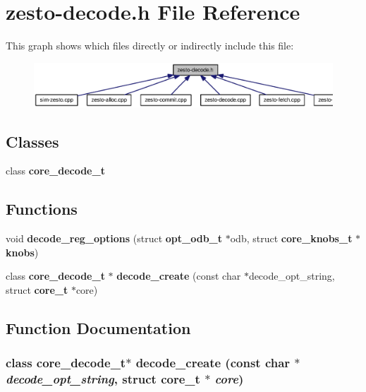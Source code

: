 \section{zesto-decode.h File Reference}
\label{zesto-decode_8h}


This graph shows which files directly or indirectly include this file:\nopagebreak
\begin{figure}[H]
\begin{center}
\leavevmode
\includegraphics[width=326pt]{zesto-decode_8h__dep__incl}
\end{center}
\end{figure}
\subsection*{Classes}
\begin{CompactItemize}
\item 
class {\bf core\_\-decode\_\-t}
\end{CompactItemize}
\subsection*{Functions}
\begin{CompactItemize}
\item 
void {\bf decode\_\-reg\_\-options} (struct {\bf opt\_\-odb\_\-t} $\ast$odb, struct {\bf core\_\-knobs\_\-t} $\ast${\bf knobs})
\item 
class {\bf core\_\-decode\_\-t} $\ast$ {\bf decode\_\-create} (const char $\ast$decode\_\-opt\_\-string, struct {\bf core\_\-t} $\ast$core)
\end{CompactItemize}


\subsection{Function Documentation}
\subsubsection[{decode\_\-create}]{\setlength{\rightskip}{0pt plus 5cm}class {\bf core\_\-decode\_\-t}$\ast$ decode\_\-create (const char $\ast$ {\em decode\_\-opt\_\-string}, \/  struct {\bf core\_\-t} $\ast$ {\em core})}\label{zesto-decode_8h_4fc719f96861588f24dd802be6e2b0df}




